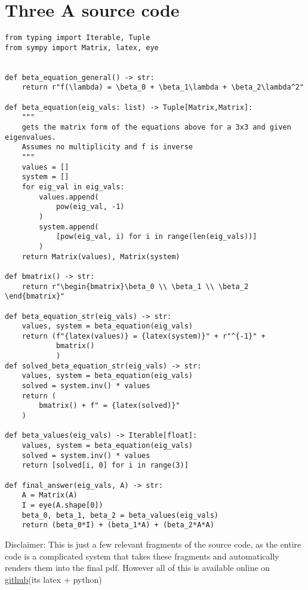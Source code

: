 \section{Three A source code} \label{appendix:two-b-src}
\begin{verbatim}
from typing import Iterable, Tuple
from sympy import Matrix, latex, eye


def beta_equation_general() -> str:
    return r"f(\lambda) = \beta_0 + \beta_1\lambda + \beta_2\lambda^2"
                       
def beta_equation(eig_vals: list) -> Tuple[Matrix,Matrix]:
    """
    gets the matrix form of the equations above for a 3x3 and given eigenvalues.
    Assumes no multiplicity and f is inverse
    """
    values = []
    system = []
    for eig_val in eig_vals:
        values.append(
            pow(eig_val, -1)
        )
        system.append(
            [pow(eig_val, i) for i in range(len(eig_vals))]
        )
    return Matrix(values), Matrix(system)

def bmatrix() -> str:
    return r"\begin{bmatrix}\beta_0 \\ \beta_1 \\ \beta_2 \end{bmatrix}"

def beta_equation_str(eig_vals) -> str:
    values, system = beta_equation(eig_vals)
    return (f"{latex(values)} = {latex(system)}" + r"^{-1}" +
            bmatrix()
            )
def solved_beta_equation_str(eig_vals) -> str:
    values, system = beta_equation(eig_vals)
    solved = system.inv() * values
    return (
        bmatrix() + f" = {latex(solved)}" 
    )

def beta_values(eig_vals) -> Iterable[float]:
    values, system = beta_equation(eig_vals)
    solved = system.inv() * values
    return [solved[i, 0] for i in range(3)]

def final_answer(eig_vals, A) -> str:
    A = Matrix(A)
    I = eye(A.shape[0])
    beta_0, beta_1, beta_2 = beta_values(eig_vals)
    return (beta_0*I) + (beta_1*A) + (beta_2*A*A)
\end{verbatim}



Disclaimer: This is just a few relevant fragments of the source code, as the entire code is a complicated system
that takes these fragments and automatically renders them into the final pdf. However all of this is available
online on \href{https://github.com/NathanRoseCE/ControlsClass}{github}(its latex + python)